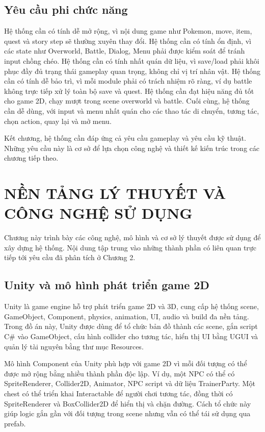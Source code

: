 \section{Yêu cầu phi chức năng}

Hệ thống cần có tính dễ mở rộng, vì nội dung game như Pokemon, move, item, quest và story step sẽ thường xuyên thay đổi. Hệ thống cần có tính ổn định, vì các state như Overworld, Battle, Dialog, Menu phải được kiểm soát để tránh input chồng chéo. Hệ thống cần có tính nhất quán dữ liệu, vì save/load phải khôi phục đầy đủ trạng thái gameplay quan trọng, không chỉ vị trí nhân vật. Hệ thống cần có tính dễ bảo trì, vì mỗi module phải có trách nhiệm rõ ràng, ví dụ battle không trực tiếp xử lý toàn bộ save và quest. Hệ thống cần đạt hiệu năng đủ tốt cho game 2D, chạy mượt trong scene overworld và battle. Cuối cùng, hệ thống cần dễ dùng, với input và menu nhất quán cho các thao tác di chuyển, tương tác, chọn action, quay lại và mở menu.

Kết chương, hệ thống cần đáp ứng cả yêu cầu gameplay và yêu cầu kỹ thuật. Những yêu cầu này là cơ sở để lựa chọn công nghệ và thiết kế kiến trúc trong các chương tiếp theo.

\chapter{NỀN TẢNG LÝ THUYẾT VÀ CÔNG NGHỆ SỬ DỤNG}

Chương này trình bày các công nghệ, mô hình và cơ sở lý thuyết được sử dụng để xây dựng hệ thống. Nội dung tập trung vào những thành phần có liên quan trực tiếp tới yêu cầu đã phân tích ở Chương 2.

\section{Unity và mô hình phát triển game 2D}

Unity là game engine hỗ trợ phát triển game 2D và 3D, cung cấp hệ thống scene, GameObject, Component, physics, animation, UI, audio và build đa nền tảng. Trong đồ án này, Unity được dùng để tổ chức bản đồ thành các scene, gắn script C\# vào GameObject, cấu hình collider cho tương tác, hiển thị UI bằng UGUI và quản lý tài nguyên bằng thư mục Resources.

Mô hình Component của Unity phù hợp với game 2D vì mỗi đối tượng có thể được mở rộng bằng nhiều thành phần độc lập. Ví dụ, một NPC có thể có SpriteRenderer, Collider2D, Animator, NPC script và dữ liệu TrainerParty. Một chest có thể triển khai Interactable để người chơi tương tác, đồng thời có SpriteRenderer và BoxCollider2D để hiển thị và chặn đường. Cách tổ chức này giúp logic gắn gần với đối tượng trong scene nhưng vẫn có thể tái sử dụng qua prefab.

